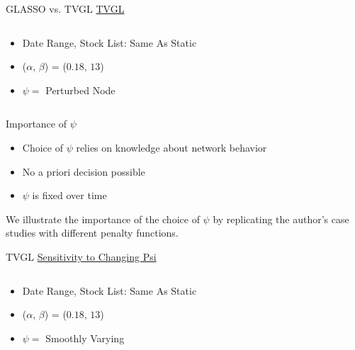 \documentclass{beamer}
\begin{document}
\begin{frame}{GLASSO vs. TVGL}
\underline{TVGL}
  \begin{columns}
    \begin{column}{0.3\linewidth}
      \begin{itemize}
        \item Date Range, Stock List: Same As Static
        \item ($\alpha$, $\beta$) = ($0.18$, $13$)
        \item $\psi = $ Perturbed Node
      \end{itemize}
    \end{column}
    \begin{column}{0.75\linewidth}
    \end{column}
  \end{columns}
\end{frame}

\begin{frame}{Importance of $\psi$}
    \begin{itemize}
        \item Choice of $\psi$ relies on knowledge about network behavior
        \item No a priori decision possible
        \item $\psi$ is fixed over time
    \end{itemize}
    We illustrate the importance of the choice of $\psi$ by replicating the author's case studies with different
    penalty functions.
\end{frame}

\begin{frame}{TVGL}
\underline{Sensitivity to Changing Psi}
  \begin{columns}
    \begin{column}{0.3\linewidth}
      \begin{itemize}
        \item Date Range, Stock List: Same As Static
        \item ($\alpha$, $\beta$) = ($0.18$, $13$)
        \item $\psi = $ Smoothly Varying
      \end{itemize}
    \end{column}
    \begin{column}{0.75\linewidth}
    \end{column}
  \end{columns}
\end{frame}
\end{document}
